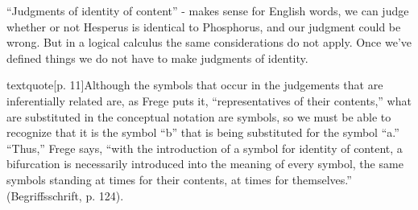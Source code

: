 ``Judgments of identity of content'' - makes sense for English words,
we can judge whether or not Hesperus is identical to Phosphorus, and
our judgment could be wrong. But in a logical calculus the same
considerations do not apply. Once we've defined things we do not have
to make judgments of identity.

textquote[p. 11]{Although the symbols that occur in the judgements
  that are inferentially related are, as Frege puts it,
  “representatives of their contents,” what are substituted in the
  conceptual notation are symbols, so we must be able to recognize
  that it is the symbol “b” that is being substituted for the symbol
  “a.” “Thus,” Frege says, “with the introduction of a symbol for
  identity of content, a bifurcation is necessarily introduced into
  the meaning of every symbol, the same symbols standing at times for
  their contents, at times for themselves.” (Begriffsschrift, p.
  124).}


